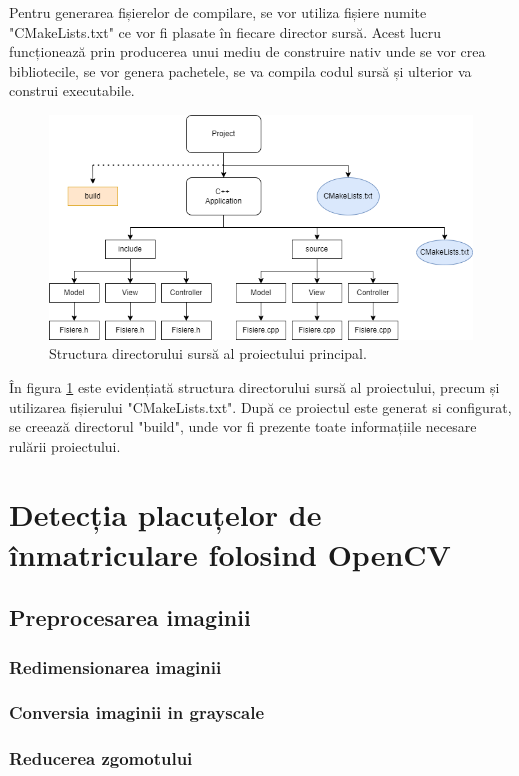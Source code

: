 \documentclass[12pt]{article}
\begin{document}
Pentru generarea fișierelor de compilare, se vor utiliza fișiere numite "CMakeLists.txt" ce vor fi plasate \^{i}n fiecare director surs\u{a}. Acest lucru funcționeaz\u{a} prin producerea unui mediu de construire nativ unde se vor crea bibliotecile, se vor genera pachetele, se va compila codul surs\u{a} și ulterior va construi executabile.

\begin{figure}[H]
  \centering
  \includegraphics[width=0.8\linewidth]{structura_cmake.png}
  \caption{Structura directorului surs\u{a} al proiectului principal.}
  \label{fig:structura_cmake}
\end{figure}


\^{I}n figura \ref{fig:structura_cmake} este evidențiat\u{a} structura directorului surs\u{a} al proiectului, precum și utilizarea fișierului "CMakeLists.txt". Dup\u{a} ce proiectul este generat si configurat, se creeaz\u{a} directorul "build", unde vor fi prezente toate informațiile necesare rul\u{a}rii proiectului.

\section{Detecția placuțelor de \^{i}nmatriculare folosind OpenCV}

\subsection{Preprocesarea imaginii}
\subsubsection{Redimensionarea imaginii}
\subsubsection{Conversia imaginii in grayscale}
\subsubsection{Reducerea zgomotului}
\end{document}
